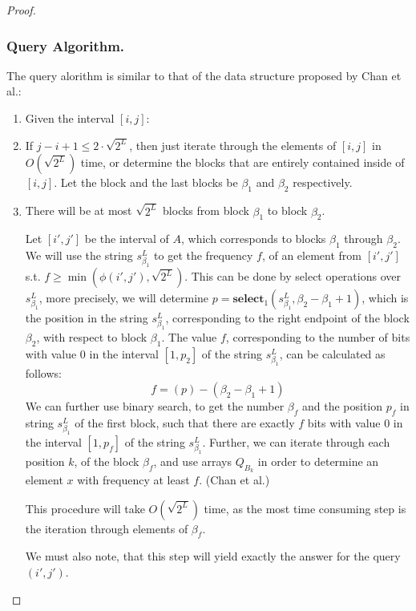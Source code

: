 \documentclass[runningheads]{llncs}
\begin{document}
\begin{proof}
    \subsubsection{Query Algorithm.} The query alorithm is similar to that of the data structure proposed by Chan et al.\cite{chan2014linear}:

    \begin{enumerate}
        \item[] Given the interval $[i,j]$:
        \item If $j-i+1\leq 2\cdot \sqrt{2^L}$, then just iterate through the elements of $[i,j]$ in $O(\sqrt{2^L})$ time, or determine the blocks that are entirely contained inside of $[i,j]$.
         Let the block and the last blocks be $\beta_1$ and $\beta_2$ respectively.  
        \item There will be at most $\sqrt{2^L}$ blocks from block $\beta_1$ to block $\beta_2$.
        
         Let $[i', j']$ be the interval of $A$, which corresponds to blocks $\beta_1$ through $\beta_2$.
         We will use the string $s^L_{\beta_1}$ to get the frequency $f$, of an element from $[i',j']$ s.t. $f \geq \min( \phi(i',j'),\sqrt{2^L} )$.
         This can be done by select operations over $s^L_{\beta_1}$, more precisely, we will determine $p=\textbf{select}_1(s^L_{\beta_1}, \beta_2-\beta_1+1 )$, 
         which is the position in the string $s^L_{\beta_1}$, corresponding to the right endpoint of the block $\beta_2$, with respect to block $\beta_1$. 
        The value $f$, corresponding to the number of bits with value $0$ in the interval $[1 , p_2]$ of the string $s^L_{\beta_1}$, can be calculated as follows:
         \[
            f = (p)-(\beta_2-\beta_1+1)
         \]
        We can further use binary search, to get the number $\beta_f$ and the position $p_f$ in string $s^L_{\beta_1}$ of the first block, such that there are exactly $f$ bits with value $0$ in the interval 
        $[1,  p_f]$ of the string $s^L_{\beta_1}$. 
        Further, we can iterate through each position $k$, of the block $\beta_f$, and use arrays $Q_{B_k}$ in order to determine an element $ x $ with frequency at least $f$. (Chan et al.\cite{chan2014linear}) 

        This procedure will take $O(\sqrt{2^L})$ time, as the most time consuming step is the iteration through elements of $\beta_f$.
         
        We must also note, that this step will yield exactly the answer for the query $(i',j')$.


\end{enumerate}
\end{proof}
\end{document}

